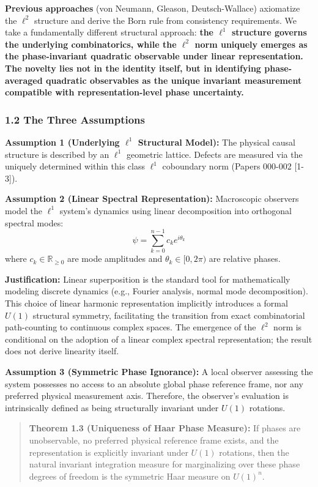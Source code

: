 \documentclass[
]{article}
\begin{document}
\textbf{Previous approaches} (von Neumann, Gleason, Deutsch-Wallace)
axiomatize the \(\ell^2\) structure and derive the Born rule from
consistency requirements. We take a fundamentally different structural
approach: \textbf{the \(\ell^1\) structure governs the underlying
combinatorics, while the \(\ell^2\) norm uniquely emerges as the
phase-invariant quadratic observable under linear representation. The
novelty lies not in the identity itself, but in identifying
phase-averaged quadratic observables as the unique invariant measurement
compatible with representation-level phase uncertainty.}

\subsubsection{1.2 The Three Assumptions}\label{the-three-assumptions}

\textbf{Assumption 1 (Underlying \(\ell^1\) Structural Model):} The
physical causal structure is described by an \(\ell^1\) geometric
lattice. Defects are measured via the uniquely determined within this
class \(\ell^1\) coboundary norm (Papers 000-002 {[}1-3{]}).

\textbf{Assumption 2 (Linear Spectral Representation):} Macroscopic
observers model the \(\ell^1\) system's dynamics using linear
decomposition into orthogonal spectral modes:
\[\psi = \sum_{k=0}^{n-1} c_k e^{i\theta_k}\] where
\(c_k \in \mathbb{R}_{\geq 0}\) are mode amplitudes and
\(\theta_k \in [0, 2\pi)\) are relative phases.

\textbf{Justification:} Linear superposition is the standard tool for
mathematically modeling discrete dynamics (e.g., Fourier analysis,
normal mode decomposition). This choice of linear harmonic
representation implicitly introduces a formal \(U(1)\) structural
symmetry, facilitating the transition from exact combinatorial
path-counting to continuous complex spaces. The emergence of the
\(\ell^2\) norm is conditional on the adoption of a linear complex
spectral representation; the result does not derive linearity itself.

\textbf{Assumption 3 (Symmetric Phase Ignorance):} A local observer
assessing the system possesses no access to an absolute global phase
reference frame, nor any preferred physical measurement axis. Therefore,
the observer's evaluation is intrinsically defined as being structurally
invariant under \(U(1)\) rotations.

\begin{quote}
\textbf{Theorem 1.3 (Uniqueness of Haar Phase Measure):} If phases are
unobservable, no preferred physical reference frame exists, and the
representation is explicitly invariant under \(U(1)\) rotations, then
the natural invariant integration measure for marginalizing over these
phase degrees of freedom is the symmetric Haar measure on \(U(1)^n\).
\end{quote}
\end{document}

